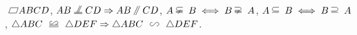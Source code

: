 \documentclass{ctexart}
\begin{document}
$\param ABCD$, $AB \paraleq CD \Rightarrow AB \zhparallel CD$, $A \zhsubsetneqq B \iff B \zhsupsetneqq A$, $A \zhsubset B \iff B \zhsupset A$, $\triangle ABC \zhcong \triangle DEF \Rightarrow \triangle ABC \zhsim \triangle DEF$.
\end{document}

